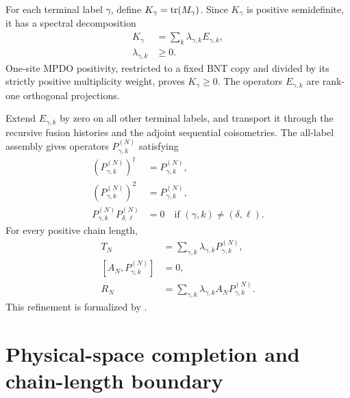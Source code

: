 \documentclass{article}
\begin{document}
For each terminal label $\gamma$, define $K_\gamma=\operatorname{tr}(M_\gamma)$. Since
$K_\gamma$ is positive semidefinite, it has a spectral decomposition
\begin{align}
    K_\gamma
    &=\sum_k\lambda_{\gamma,k}E_{\gamma,k},
    \label{eq:cpsv16_topological_projector_recursion_terminal_spectral_decomposition}\\
    \lambda_{\gamma,k}
    &\geq0.
    \label{eq:cpsv16_topological_projector_recursion_terminal_eigenvalue_positivity}
\end{align}
One-site MPDO positivity, restricted to a fixed BNT copy and divided by its
strictly positive multiplicity weight, proves $K_\gamma\geq0$. The operators
$E_{\gamma,k}$ are rank-one orthogonal projections.

Extend $E_{\gamma,k}$ by zero on all other terminal labels, and transport it
through the recursive fusion histories and the adjoint sequential
coisometries. The all-label assembly gives operators
$P_{\gamma,k}^{(N)}$ satisfying
\begin{align}
    (P_{\gamma,k}^{(N)})^\dagger
    &=P_{\gamma,k}^{(N)},
    \label{eq:cpsv16_topological_projector_recursion_refined_projector_self_adjoint}\\
    (P_{\gamma,k}^{(N)})^2
    &=P_{\gamma,k}^{(N)},
    \label{eq:cpsv16_topological_projector_recursion_refined_projector_idempotent}\\
    P_{\gamma,k}^{(N)}P_{\delta,\ell}^{(N)}
    &=0
    \quad\text{if }(\gamma,k)\neq(\delta,\ell).
    \label{eq:cpsv16_topological_projector_recursion_refined_projector_orthogonality}
\end{align}
For every positive chain length,
\begin{align}
    T_N
    &=\sum_{\gamma,k}\lambda_{\gamma,k}P_{\gamma,k}^{(N)},
    \label{eq:cpsv16_topological_projector_recursion_terminal_spectral_refinement}\\
    [A_N,P_{\gamma,k}^{(N)}]
    &=0,
    \label{eq:cpsv16_topological_projector_recursion_projector_weight_commutator}\\
    R_N
    &=\sum_{\gamma,k}
      \lambda_{\gamma,k}A_NP_{\gamma,k}^{(N)}.
    \label{eq:cpsv16_topological_projector_recursion_terminal_density_refinement}
\end{align}
This refinement is formalized by
.

\section{Physical-space completion and chain-length boundary}
\end{document}
